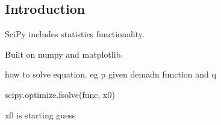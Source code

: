
\subsection{Introduction}

SciPy includes statistics functionality.

Built on numpy and matplotlib.

how to solve equation. eg p given demadn function and q

scipy.optimize.fsolve(func, x0)

x0 is starting guess
  
